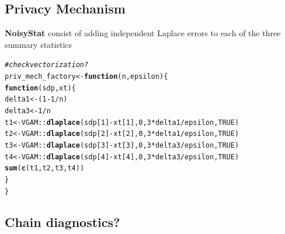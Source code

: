 \documentclass{article}\usepackage[]{graphicx}\usepackage[]{xcolor}
\makeatletter
\newcommand{\hlnum}[1]{\textcolor[rgb]{0.686,0.059,0.569}{#1}}%
\newcommand{\hlcom}[1]{\textcolor[rgb]{0.678,0.584,0.686}{\textit{#1}}}%
\newcommand{\hlopt}[1]{\textcolor[rgb]{0,0,0}{#1}}%
\newcommand{\hlstd}[1]{\textcolor[rgb]{0.345,0.345,0.345}{#1}}%
\newcommand{\hlkwa}[1]{\textcolor[rgb]{0.161,0.373,0.58}{\textbf{#1}}}%
\newcommand{\hlkwb}[1]{\textcolor[rgb]{0.69,0.353,0.396}{#1}}%
\newcommand{\hlkwc}[1]{\textcolor[rgb]{0.333,0.667,0.333}{#1}}%
\newcommand{\hlkwd}[1]{\textcolor[rgb]{0.737,0.353,0.396}{\textbf{#1}}}%
\newenvironment{kframe}{%
 \def\at@end@of@kframe{}%
 \ifinner\ifhmode%
  \def\at@end@of@kframe{\end{minipage}}%
  \begin{minipage}{\columnwidth}%
 \fi\fi%
 \def\FrameCommand##1{\hskip\@totalleftmargin \hskip-\fboxsep
 \colorbox{shadecolor}{##1}\hskip-\fboxsep
     \hskip-\linewidth \hskip-\@totalleftmargin \hskip\columnwidth}%
 \MakeFramed {\advance\hsize-\width
   \@totalleftmargin\z@ \linewidth\hsize
   \@setminipage}}%
 {\par\unskip\endMakeFramed%
 \at@end@of@kframe}
\newenvironment{knitrout}{}{} %
\theoremstyle{definition}
\makeatother
\begin{document}
\subsection*{Privacy Mechanism}
\textbf{NoisyStat} consist of adding independent Laplace errors
to each of the three summary statistics
\begin{knitrout}
\color{fgcolor}\begin{kframe}
\begin{alltt}
\hlcom{#check vectorization?}
\hlstd{priv_mech_factory} \hlkwb{<-} \hlkwa{function}\hlstd{(}\hlkwc{n}\hlstd{,} \hlkwc{epsilon}\hlstd{) \{}
  \hlkwa{function}\hlstd{(}\hlkwc{sdp}\hlstd{,} \hlkwc{xt}\hlstd{) \{}
    \hlstd{delta1} \hlkwb{<-} \hlstd{(}\hlnum{1}\hlopt{-} \hlnum{1}\hlopt{/}\hlstd{n)}
    \hlstd{delta3} \hlkwb{<-} \hlnum{1}\hlopt{/}\hlstd{n}
    \hlstd{t1} \hlkwb{<-} \hlstd{VGAM}\hlopt{::}\hlkwd{dlaplace}\hlstd{(sdp[}\hlnum{1}\hlstd{]} \hlopt{-} \hlstd{xt[}\hlnum{1}\hlstd{],} \hlnum{0}\hlstd{,} \hlnum{3} \hlopt{*} \hlstd{delta1}\hlopt{/}\hlstd{epsilon,} \hlnum{TRUE}\hlstd{)}
    \hlstd{t2} \hlkwb{<-} \hlstd{VGAM}\hlopt{::}\hlkwd{dlaplace}\hlstd{(sdp[}\hlnum{2}\hlstd{]} \hlopt{-} \hlstd{xt[}\hlnum{2}\hlstd{],} \hlnum{0}\hlstd{,} \hlnum{3} \hlopt{*} \hlstd{delta1}\hlopt{/}\hlstd{epsilon,} \hlnum{TRUE}\hlstd{)}
    \hlstd{t3} \hlkwb{<-} \hlstd{VGAM}\hlopt{::}\hlkwd{dlaplace}\hlstd{(sdp[}\hlnum{3}\hlstd{]} \hlopt{-} \hlstd{xt[}\hlnum{3}\hlstd{],} \hlnum{0}\hlstd{,} \hlnum{3} \hlopt{*} \hlstd{delta3}\hlopt{/}\hlstd{epsilon,} \hlnum{TRUE}\hlstd{)}
    \hlstd{t4} \hlkwb{<-} \hlstd{VGAM}\hlopt{::}\hlkwd{dlaplace}\hlstd{(sdp[}\hlnum{4}\hlstd{]} \hlopt{-} \hlstd{xt[}\hlnum{4}\hlstd{],} \hlnum{0}\hlstd{,} \hlnum{3} \hlopt{*} \hlstd{delta3}\hlopt{/}\hlstd{epsilon,} \hlnum{TRUE}\hlstd{)}
    \hlkwd{sum}\hlstd{(}\hlkwd{c}\hlstd{(t1,t2,t3,t4))}
  \hlstd{\}}
\hlstd{\}}
\end{alltt}
\end{kframe}
\end{knitrout}

\subsection*{Chain diagnostics?}
\end{document}
